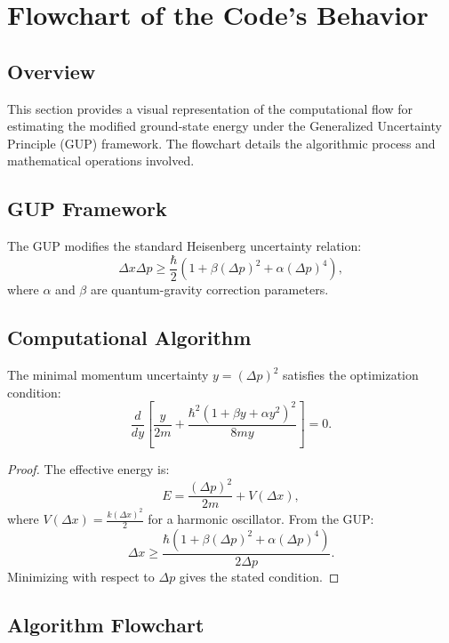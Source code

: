 \section{Flowchart of the Code's Behavior}

\subsection{Overview}

This section provides a visual representation of the computational flow for estimating the modified ground-state energy under the Generalized Uncertainty Principle (GUP) framework. The flowchart details the algorithmic process and mathematical operations involved.

\subsection{GUP Framework}

\begin{definition}
The GUP modifies the standard Heisenberg uncertainty relation:
\[
\Delta x \Delta p \geq \frac{\hbar}{2}\left(1 + \beta(\Delta p)^2 + \alpha(\Delta p)^4\right),
\]
where $\alpha$ and $\beta$ are quantum-gravity correction parameters.
\end{definition}

\subsection{Computational Algorithm}

\begin{theorem}
The minimal momentum uncertainty $y = (\Delta p)^2$ satisfies the optimization condition:
\[
\frac{d}{dy}\left[\frac{y}{2m} + \frac{\hbar^2(1 + \beta y + \alpha y^2)^2}{8my}\right] = 0.
\]
\end{theorem}

\begin{proof}
The effective energy is:
\[
E = \frac{(\Delta p)^2}{2m} + V(\Delta x),
\]
where $V(\Delta x) = \frac{k(\Delta x)^2}{2}$ for a harmonic oscillator. From the GUP:
\[
\Delta x \geq \frac{\hbar(1 + \beta(\Delta p)^2 + \alpha(\Delta p)^4)}{2\Delta p}.
\]
Minimizing with respect to $\Delta p$ gives the stated condition.
\end{proof}

\subsection{Algorithm Flowchart}

